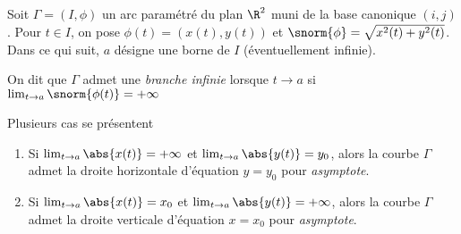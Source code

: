 Soit $\Gamma=(I,\phi)$ un arc paramétré du plan $\R^2$ muni de la base canonique $(i,j)$. Pour $t\in I$, on pose $\phi(t) = (x(t),y(t))$ et $\snorm{\phi} = \sqrt{x^2(t) + y^2(t)}$. Dans ce qui suit, $a$ désigne une borne de $I$ (éventuellement infinie).

\begin{definition}
	On dit que $\Gamma$ admet une \emph{branche infinie} lorsque $t\to a$ si $\lim_{t\to a} \snorm{\phi(t)} = +\infty$
\end{definition}
\sld{\vfill\pagebreak[5]}%

Plusieurs cas se présentent 
\begin{enumerate}
	\item Si $\lim_{t\to a} \abs{x(t)} = +\infty$ et  $\lim_{t\to a} \abs{y(t)} = y_0$, alors la courbe $\Gamma$ admet la droite horizontale d'équation $y=y_0$ pour \emph{asymptote}.
		\begin{center}
		\end{center}\sld{\vfill\pagebreak[5]}%

	\item Si $\lim_{t\to a} \abs{x(t)} = x_0$ et  $\lim_{t\to a} \abs{y(t)} = +\infty$, alors la courbe $\Gamma$ admet la droite verticale d'équation $x=x_0$ pour \emph{asymptote}.
		\begin{center}
		\end{center}\sld{\vfill\pagebreak[5]}%


\end{enumerate}
